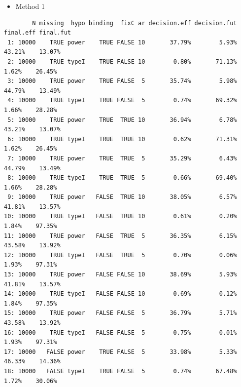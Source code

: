 \documentclass[12pt]{article}
\begin{document}
\begin{itemize}
\item Method 1
\end{itemize}
\begin{verbatim}
        N missing  hypo binding  fixC ar decision.eff decision.fut final.eff final.fut
 1: 10000    TRUE power    TRUE FALSE 10       37.79%        5.93%    43.21%    13.07%
 2: 10000    TRUE typeI    TRUE FALSE 10        0.80%       71.13%     1.62%    26.45%
 3: 10000    TRUE power    TRUE FALSE  5       35.74%        5.98%    44.79%    13.49%
 4: 10000    TRUE typeI    TRUE FALSE  5        0.74%       69.32%     1.66%    28.28%
 5: 10000    TRUE power    TRUE  TRUE 10       36.94%        6.78%    43.21%    13.07%
 6: 10000    TRUE typeI    TRUE  TRUE 10        0.62%       71.31%     1.62%    26.45%
 7: 10000    TRUE power    TRUE  TRUE  5       35.29%        6.43%    44.79%    13.49%
 8: 10000    TRUE typeI    TRUE  TRUE  5        0.66%       69.40%     1.66%    28.28%
 9: 10000    TRUE power   FALSE  TRUE 10       38.05%        6.57%    41.81%    13.57%
10: 10000    TRUE typeI   FALSE  TRUE 10        0.61%        0.20%     1.84%    97.35%
11: 10000    TRUE power   FALSE  TRUE  5       36.35%        6.15%    43.58%    13.92%
12: 10000    TRUE typeI   FALSE  TRUE  5        0.70%        0.06%     1.93%    97.31%
13: 10000    TRUE power   FALSE FALSE 10       38.69%        5.93%    41.81%    13.57%
14: 10000    TRUE typeI   FALSE FALSE 10        0.69%        0.12%     1.84%    97.35%
15: 10000    TRUE power   FALSE FALSE  5       36.79%        5.71%    43.58%    13.92%
16: 10000    TRUE typeI   FALSE FALSE  5        0.75%        0.01%     1.93%    97.31%
17: 10000   FALSE power    TRUE FALSE  5       33.98%        5.33%    46.33%    14.36%
18: 10000   FALSE typeI    TRUE FALSE  5        0.74%       67.48%     1.72%    30.06%
\end{verbatim}

\clearpage
\end{document}
